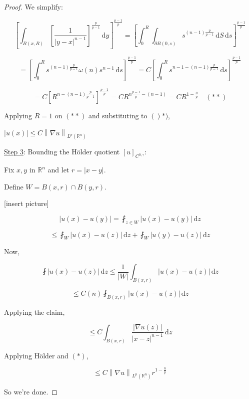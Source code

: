 \documentclass{article}
\theoremstyle{definition}
\begin{document}
\begin{proof}
We simplify:

\[
    \left[ \int_{B(x,R)}^{} \left[ \frac{1}{\vert y - x \vert ^{n-1}} \right] ^{\frac{p}{p-1}} \,\mathrm{d}y \right] ^{\frac{p-1}{p}} = \left[ \int_{0}^{R} \int_{\partial B(0,s)}^{} s^{(n-1)\frac{p}{p-1}} \,\mathrm{d}S  \,\mathrm{d}s \right] ^{\frac{p-1}{p}}
\]

\[
    = \left[ \int_{0}^{R} s^{(n-1)\frac{p}{p-1}} \omega (n) s^{n-1} \,\mathrm{d}s \right]^{\frac{p-1}{p}} = C \left[ \int_{0}^{R} s^{n-1 - (n-1)\frac{p}{p-1}} \,\mathrm{d}s  \right] ^{\frac{p-1}{p}}
\]

\[
    = C \left[ R^{n - (n-1)\frac{p}{p-1}} \right]^{\frac{p-1}{p}} = C R^{n\frac{p-1}{p} - (n-1)} = C R^{1- \frac{n}{p}} \quad (\ast\ast)
\]

Applying \(R = 1\) on \((\ast\ast)\) and substituting to \(()\ast)\), 

\(\vert u(x) \vert \leq C \left\lVert \nabla u \right\rVert _{L^p(\mathbb{R}^n)}\) 


\underline{Step 3}: Bounding the H\"older quotient \([u]_{C^{0,\gamma}}\):

Fix \(x,y\) in \(\mathbb{R}^n\) and let \(r = \vert x - y \vert\).

Define \(W = B(x,r) \cap B(y,r)\).

[insert picture]

\[
    \vert u(x) - u(y) \vert = \fint_{z\in W} \vert u(x) - u(y) \vert \, \mathrm{d} z
\]

\[
    \leq \fint_W \vert u(x) - u(z) \vert \, \mathrm{d}z + \fint_W \vert u(y) - u(z) \vert \, \mathrm{d}z
\]

Now,

\[
    \fint \vert u(x) - u(z) \vert \, \mathrm{d}z \leq \frac{1}{\vert W \vert} \int_{B(x,r)}^{} \vert u(x) - u(z) \vert  \,\mathrm{d}z 
\]

\[
    \leq C(n) \fint_{B(x,r)} \vert u(x) - u(z) \vert \, \mathrm{d}z
\]

Applying the claim,

\[
    \leq C \int_{B(x,r)}^{} \frac{\vert \nabla u(z) \vert }{\vert x - z \vert ^{n-1}} \,\mathrm{d}z 
\]

Applying H\"older and \((\ast)\),

\[
    \leq C \left\lVert \nabla u \right\rVert _{L^p(\mathbb{R}^n)} r^{1-\frac{n}{p}}
\]

So we're done.

\end{proof}
\end{document}
